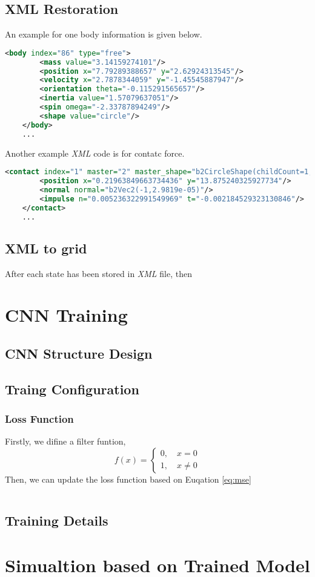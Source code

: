 \subsection{XML Restoration}

An example for one body information is given below.
\begin{lstlisting}[language=XML]
    <body index="86" type="free">
        <mass value="3.14159274101"/>
        <position x="7.79289388657" y="2.62924313545"/>
        <velocity x="2.7878344059" y="-1.45545887947"/>
        <orientation theta="-0.115291565657"/>
        <inertia value="1.57079637051"/>
        <spin omega="-2.33787894249"/>
        <shape value="circle"/>
    </body>
    ...
\end{lstlisting}

Another example \textit{XML} code is for contatc force.
\begin{lstlisting}[language=XML]
    <contact index="1" master="2" master_shape="b2CircleShape(childCount=1, pos=b2Vec2(0,0), radius=1.2000000476837158, type=0,)" slave="97" slave_shape="b2CircleShape(childCount=1, pos=b2Vec2(0,0), radius=1.2000000476837158, type=0, )">
        <position x="0.21963849663734436" y="13.875240325927734"/>
        <normal normal="b2Vec2(-1,2.9819e-05)"/>
        <impulse n="0.005236322991549969" t="-0.002184529323130846"/>
    </contact>
    ...
\end{lstlisting}

\subsection{XML to grid}
After each state has been stored in \textit{XML} file, then 


\section{CNN Training}

\subsection{CNN  Structure Design}

\subsection{Traing Configuration}
\subsubsection{Loss Function}
Firstly, we difine a filter funtion,
\begin{equation}
    f(x)= \begin{cases} 0, \quad x = 0 \\ 1, \quad x \ne 0 \end{cases}
\end{equation}
Then, we can update the loss function based on Euqation \ref{eq:mse}

\begin{equation}
\end{equation}

\subsection{Training Details}

\section{Simualtion based on Trained Model}
